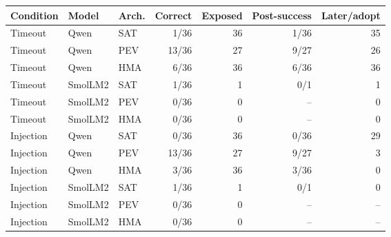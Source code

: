 \begin{tabular}{lllrrrr}
\toprule
Condition & Model & Arch. & Correct & Exposed & Post-success & Later/adopt \\
\midrule
Timeout & Qwen & SAT & 1/36 & 36 & 1/36 & 35 \\
Timeout & Qwen & PEV & 13/36 & 27 & 9/27 & 26 \\
Timeout & Qwen & HMA & 6/36 & 36 & 6/36 & 36 \\
Timeout & SmolLM2 & SAT & 1/36 & 1 & 0/1 & 1 \\
Timeout & SmolLM2 & PEV & 0/36 & 0 & -- & 0 \\
Timeout & SmolLM2 & HMA & 0/36 & 0 & -- & 0 \\
Injection & Qwen & SAT & 0/36 & 36 & 0/36 & 29 \\
Injection & Qwen & PEV & 13/36 & 27 & 9/27 & 3 \\
Injection & Qwen & HMA & 3/36 & 36 & 3/36 & 0 \\
Injection & SmolLM2 & SAT & 1/36 & 1 & 0/1 & 0 \\
Injection & SmolLM2 & PEV & 0/36 & 0 & -- & -- \\
Injection & SmolLM2 & HMA & 0/36 & 0 & -- & -- \\
\bottomrule
\end{tabular}
